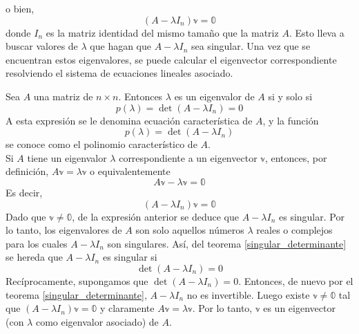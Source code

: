 \newpage
{}

\noindent o bien,
$$(A - \lambda I_n) \mathbb{v} = \mathbb{0}$$
donde $I_n$ es la matriz identidad del mismo tamaño que la matriz $A$. Esto lleva a buscar valores de $\lambda$ que hagan que $A - \lambda I_n$ sea singular. Una vez que se encuentran estos eigenvalores, se puede calcular el eigenvector correspondiente resolviendo el sistema de ecuaciones lineales asociado.

\begin{theorem}
    Sea $A$ una matriz de $n \times n$. Entonces $\lambda$ es un eigenvalor de $A$ si y solo si
    $$p(\lambda) = \det(A - \lambda I_n) = 0$$
    A esta expresión se le denomina ecuación característica de $A$, y la función
    $$p(\lambda) = \det(A - \lambda I_n)$$
    se conoce como el polinomio característico de $A$. \\
    \demostracion Si $A$ tiene un eigenvalor $\lambda$ correspondiente a un eigenvector $\mathbb{v}$, entonces, por definición, $A \mathbb{v} = \lambda \mathbb{v}$ o equivalentemente
    $$A \mathbb{v} - \lambda \mathbb{v} = \mathbb{0}$$
    Es decir,
    $$(A - \lambda I_n) \mathbb{v} = \mathbb{0}$$
    Dado que $\mathbb{v} \neq \mathbb{0}$, de la expresión anterior se deduce que $A - \lambda I_n$ es singular. Por lo tanto, los eigenvalores de $A$ son solo aquellos números $\lambda$ reales o complejos para los cuales $A - \lambda I_n$ son singulares. Así, del teorema \ref{singular_determinante} se hereda que $A - \lambda I_n$ es singular si
    $$\det(A - \lambda I_n) = 0$$
    Recíprocamente, supongamos que $\det(A - \lambda I_n) = 0$. Entonces, de nuevo por el teorema \ref{singular_determinante}, $A - \lambda I_n$ no es invertible. Luego existe $\mathbb{v} \neq \mathbb{0}$ tal que $(A - \lambda I_n) \mathbb{v} = \mathbb{0}$ y claramente $A \mathbb{v} = \lambda \mathbb{v}$. Por lo tanto, $\mathbb{v}$ es un eigenvector (con $\lambda$ como eigenvalor asociado) de $A$.
\end{theorem}

